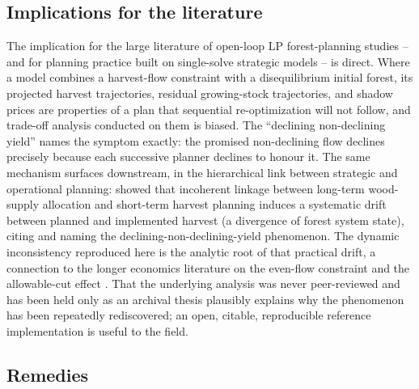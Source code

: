 \hypertarget{implications-for-the-literature}{%
\subsection{Implications for the literature}\label{implications-for-the-literature}}

The implication for the large literature of open-loop LP forest-planning studies -- and for planning practice built on single-solve strategic models -- is direct. Where a model combines a harvest-flow constraint with a disequilibrium initial forest, its projected harvest trajectories, residual growing-stock trajectories, and shadow prices are properties of a plan that sequential re-optimization will not follow, and trade-off analysis conducted on them is biased. The ``declining non-declining yield'' \citep[pp.~331--332]{gunn2007models} names the symptom exactly: the promised non-declining flow declines precisely because each successive planner declines to honour it. The same mechanism surfaces downstream, in the hierarchical link between strategic and operational planning: \citet{paradis2013risk} showed that incoherent linkage between long-term wood-supply allocation and short-term harvest planning induces a systematic drift between planned and implemented harvest (a divergence of forest system state), citing \citet{daugherty1991credibility} and naming the declining-non-declining-yield phenomenon. The dynamic inconsistency reproduced here is the analytic root of that practical drift, a connection to the longer economics literature on the even-flow constraint and the allowable-cut effect \citep{thompson1966traditional,schweitzer1972allowable,luckert1995allowable,hegan2000economic}. That the underlying analysis was never peer-reviewed and has been held only as an archival thesis plausibly explains why the phenomenon has been repeatedly rediscovered; an open, citable, reproducible reference implementation is useful to the field.

\hypertarget{remedies}{%
\subsection{Remedies}\label{remedies}}

